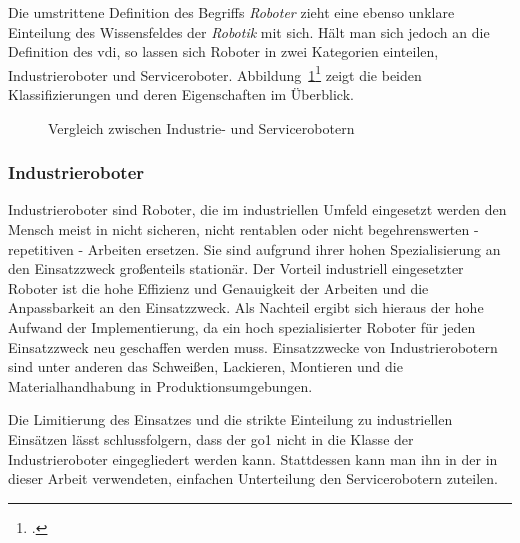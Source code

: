 Die umstrittene Definition des Begriffs \emph{Roboter} zieht eine ebenso unklare Einteilung des Wissensfeldes der \emph{Robotik} mit sich.
Hält man sich jedoch an die Definition des \gls{vdi}, so lassen sich Roboter in zwei Kategorien einteilen, Industrieroboter und Serviceroboter.
Abbildung~\ref{fig:industrie_vs_service}\footcite{statista_robotics_market} zeigt die beiden Klassifizierungen und deren Eigenschaften im Überblick.

\begin{figure}[h]
    \caption{Vergleich zwischen Industrie- und Servicerobotern}\label{fig:industrie_vs_service}
\end{figure}

\subsubsection{Industrieroboter}

Industrieroboter sind Roboter, die im industriellen Umfeld eingesetzt werden den Mensch meist in nicht sicheren,
nicht rentablen oder nicht begehrenswerten - repetitiven - Arbeiten ersetzen.
Sie sind aufgrund ihrer hohen Spezialisierung an den Einsatzzweck großenteils stationär.
Der Vorteil industriell eingesetzter Roboter ist die hohe Effizienz und Genauigkeit der Arbeiten und die Anpassbarkeit an
den Einsatzzweck.
Als Nachteil ergibt sich hieraus der hohe Aufwand der Implementierung, da ein hoch spezialisierter Roboter für jeden
Einsatzzweck neu geschaffen werden muss.
Einsatzzwecke von Industrierobotern sind unter anderen das Schweißen, Lackieren, Montieren und die Materialhandhabung in
Produktionsumgebungen.

Die Limitierung des Einsatzes und die strikte Einteilung zu industriellen Einsätzen lässt schlussfolgern, dass der \gls{go1}
nicht in die Klasse der Industrieroboter eingegliedert werden kann.
Stattdessen kann man ihn in der in dieser Arbeit verwendeten, einfachen Unterteilung den Servicerobotern zuteilen.

